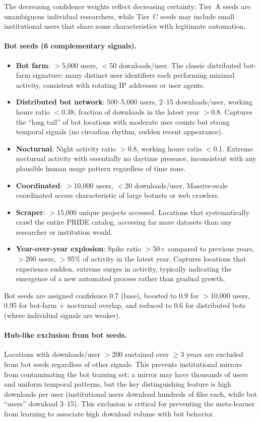 \documentclass[11pt,a4paper]{article}
\begin{document}
\noindent The decreasing confidence weights reflect decreasing certainty: Tier~A seeds are unambiguous individual researchers, while Tier~C seeds may include small institutional users that share some characteristics with legitimate automation.

\paragraph{Bot seeds (6 complementary signals).}
\begin{itemize}
    \item \textbf{Bot farm}: $>$5,000 users, $<$50 downloads/user. The classic distributed bot-farm signature: many distinct user identifiers each performing minimal activity, consistent with rotating IP addresses or user agents.
    \item \textbf{Distributed bot network}: 500--5,000 users, 2--15 downloads/user, working hours ratio $<$0.38, fraction of downloads in the latest year $>$0.8. Captures the ``long tail'' of bot locations with moderate user counts but strong temporal signals (no circadian rhythm, sudden recent appearance).
    \item \textbf{Nocturnal}: Night activity ratio $>$0.8, working hours ratio $<$0.1. Extreme nocturnal activity with essentially no daytime presence, inconsistent with any plausible human usage pattern regardless of time zone.
    \item \textbf{Coordinated}: $>$10,000 users, $<$20 downloads/user. Massive-scale coordinated access characteristic of large botnets or web crawlers.
    \item \textbf{Scraper}: $>$15,000 unique projects accessed. Locations that systematically crawl the entire PRIDE catalog, accessing far more datasets than any researcher or institution would.
    \item \textbf{Year-over-year explosion}: Spike ratio $>$50$\times$ compared to previous years, $>$200 users, $>$95\% of activity in the latest year. Captures locations that experience sudden, extreme surges in activity, typically indicating the emergence of a new automated process rather than gradual growth.
\end{itemize}

\noindent Bot seeds are assigned confidence 0.7 (base), boosted to 0.9 for $>$10,000 users, 0.95 for bot-farm + nocturnal overlap, and reduced to 0.6 for distributed bots (where individual signals are weaker).

\paragraph{Hub-like exclusion from bot seeds.} Locations with downloads/user $>$200 sustained over $\geq$3 years are excluded from bot seeds regardless of other signals. This prevents institutional mirrors from contaminating the bot training set; a mirror may have thousands of users and uniform temporal patterns, but the key distinguishing feature is high downloads per user (institutional users download hundreds of files each, while bot ``users'' download 3--15). This exclusion is critical for preventing the meta-learner from learning to associate high download volume with bot behavior.
\end{document}
